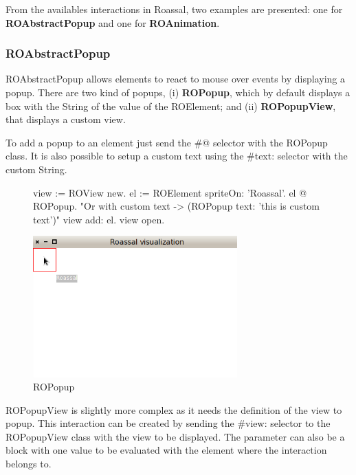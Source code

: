 \documentclass[a4paper,10pt,twoside]{book}
\begin{document}
From the availables interactions in Roassal, two examples are presented: one for \textbf{ROAbstractPopup} and one for \textbf{ROAnimation}.

\subsubsection*{ROAbstractPopup}

ROAbstractPopup allows elements to react to mouse over events by displaying a popup. There are two kind of popups, (i) \textbf{ROPopup}, which by default displays a box with the String of the value of the ROElement; and (ii) \textbf{ROPopupView}, that displays a custom view.

To add a popup to an element just send the \#@ selector with the ROPopup class. It is also possible to setup a custom text using the \#text: selector with the custom String.

\begin{figure}[H]
      \begin{minipage}[t]{1\textwidth}
      \vspace{0pt}
     \begin{code}{}
view := ROView new.
el := ROElement spriteOn: 'Roassal'.
el @ ROPopup. "Or with custom text -> (ROPopup text: 'this is custom text')"
view add: el.
view open.
  \end{code}
   \end{minipage}
   \hfill
   \begin{minipage}[t]{1\textwidth}
	 \vspace{0pt} \raggedright
       \centering
		\includegraphics[width=0.7\textwidth]{popup}
   \end{minipage}
\label{fig:popup}
\caption{ROPopup}
\end{figure} 

ROPopupView is slightly more complex as it needs the definition of the view to popup. This interaction can be created by sending the \#view: selector to the ROPopupView class with the view to be displayed. The parameter can also be a block with one value to be evaluated with the element where the interaction belongs to.
\end{document}
